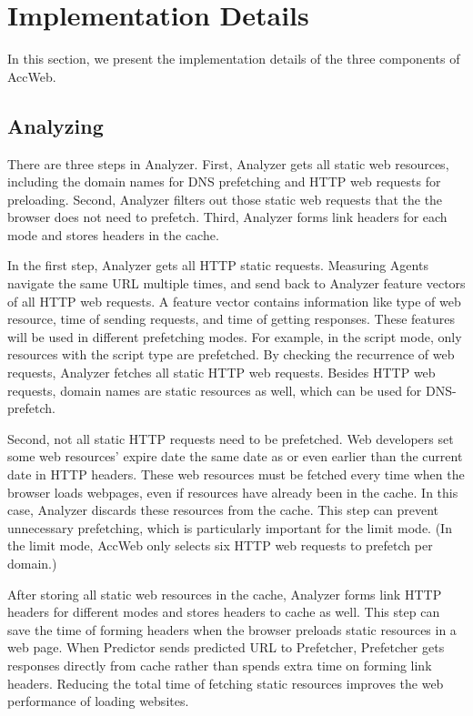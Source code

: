 \section{Implementation Details}
\label{sec:details}

In this section, we present the implementation details of the three components of AccWeb.

\subsection{Analyzing}

There are three steps in Analyzer. First, Analyzer gets all static web resources, including the domain names for DNS prefetching and HTTP web requests for preloading. Second, Analyzer filters out those static web requests that the the browser does not need to prefetch. Third, Analyzer forms link headers for each mode and stores headers in the cache.

In the first step, Analyzer gets all HTTP static requests. Measuring Agents navigate the same URL multiple times, and send back to Analyzer feature vectors of all HTTP web requests. A feature vector contains information like type of web resource, time of sending requests, and time of getting responses. These features will be used in different prefetching modes. For example, in the script mode, only resources with the script type are prefetched. By checking the recurrence of web requests, Analyzer fetches all static HTTP web requests. Besides HTTP web requests, domain names are static resources as well, which can be used for DNS-prefetch.

Second, not all static HTTP requests need to be prefetched. Web developers set some web resources' expire date the same date as or even earlier than the current date in HTTP headers. 
These web resources must be fetched every time when the browser loads webpages, even if resources have already been in the cache. In this case, Analyzer discards these resources from the cache. This step can prevent unnecessary prefetching, which is particularly important for the limit mode. (In the limit mode, AccWeb only selects six HTTP web requests to prefetch per domain.) %

After storing all static web resources in the cache, Analyzer forms link HTTP headers for different modes and stores headers to cache as well. This step can save the time of forming headers when the browser preloads static resources in a web page. When Predictor sends predicted URL to Prefetcher, Prefetcher gets responses directly from cache rather than spends extra time on forming link headers. Reducing the total time of fetching static resources improves the web performance of loading websites.  


